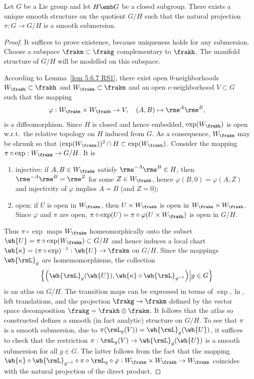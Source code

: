 \begin{thm}
    Let $G$ be a Lie group and let $H\emb G$ be a closed subgroup. There exists a unique smooth structure on the quotient $G\slash H$ such that the natural projection $\pi:G\to G\slash H$ is a smooth submersion.
\end{thm}
\begin{proof}
    It suffices to prove existence, because uniqueness holds for any submersion. Choose a subspace $\frakm\subset \frakg$ complementary to $\frakh$. The manifold structure of $G\slash H$ will be modelled on this subspace.

    According to Lemma~\ref{lem 5.6.7 RS1}, there exist open $0$-neighborhoods $W_\frakh\subset\frakh$ and $W_\frakm\subset\frakm$  and an open $e$-neighborhood $V\subset G$ such that the mapping
    \[\varphi:W_\frakm\times W_\frakh\to V,\quad (A,B)\mapsto \rme^A \rme^B,\]
    is a diffeomorphism. Since $H$ is closed and hence embedded, $\exp (W_\frakh)$ is open w.r.t.\ the relative topology on $H$ induced from $G$. As a consequence, $W_\frakm$ may be shrunk so that $(\exp(W_\frakm))^2\cap H\subset \exp(W_\frakh)$. Consider the mapping $\pi\circ \exp:W_\frakm\to G\slash H$. It is
    \begin{enumerate}[label=(\alph*)]
        \item injective: if $A,B\in W_\frakm$ satisfy $\rme^{-A}\rme^B\in H$, then $\rme^{-A}\rme^B=\rme^Z$ for some $Z\in W_\frakh$, hence $\varphi(B,0)=\varphi(A,Z)$ and injectivity of $\varphi$ implies $A=B$ (and $Z=0$);
        \item open: if $U$ is open in $W_\frakm$, then $U\times W_\frakh$ is open in $W_\frakm\times W_\frakh$. Since $\varphi$ and $\pi$ are open, $\pi\circ\exp(U)=\pi\circ\varphi(U\times W_\frakh)$ is open in $G\slash H$.
    \end{enumerate}
    Thus $\pi\circ\exp$ maps $W_\frakm$ homeomorphically onto the subset $\wh{U}=\pi\circ\exp(W_\frakm)\subset G\slash H$ and hence induces a local chart $\wh{\kappa}=(\pi\circ\exp)^{-1}:\wh{U}\to \frakm$ on $G\slash H$. Since the mappings $\wh{\rmL}_g$ are homemomorphisms, the collection
    \[\left\{\left(\wh{\rmL}_g(\wh{U}),\wh{\kappa}\circ \wh{\rmL}_{g^{-1}}\right)\middle| g\in G\right\}\]
    is an atlas on $G\slash H$. The transition maps can be expressed in terms of $\exp,\ln$, left translations, and the projection $\frakg\to\frakm$ defined by the vector space decomposition $\frakg=\frakh\oplus\frakm$. It follows that the atlas so constructed defines a smooth (in fact analytic) structure on $G\slash H$. To see that $\pi$ is a smooth submersion, due to $\pi(\rmL_g(V))=\wh{\rmL}_g(\wh{U})$, it suffices to check that the restriction $\pi:\rmL_g(V)\to \wh{\rmL}_g(\wh{U})$ is a smooth submersion for all $g\in G$. The latter follows from the fact that the mapping $\wh{\kappa}\circ\wh{\rmL}_{g^{-1}}\circ\pi\circ \rmL_g\circ\varphi:W_\frakm\times W_\frakh\to W_\frakm$ coincides with the natural projection of the direct product.
\end{proof}



